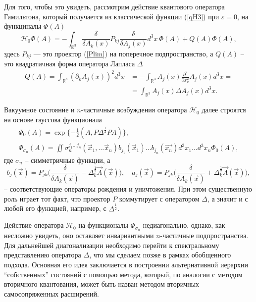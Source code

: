 \documentclass[12pt]{article}
\newcommand{\pl}{\partial}
\newcommand{\HH}{\mathscr{H}}
\newcommand{\RR}{\mathbb{R}}
\newcommand{\ve}{\varepsilon}
\begin{document}
    Для того, чтобы это увидеть, рассмотрим действие квантового оператора
    Гамильтона, который получается из классической функции
(\ref{qH3})
    при
$ \ve = 0 $,
    на функциналы
$ \Phi(A) $
\begin{equation}
\label{qH0}
    \HH_{0}\Phi(A) = - \int_{\RR^{3}} \frac{\delta}{\delta A_{k}(x)}
	P_{kj} \frac{\delta}{\delta A_{j}(x)} d^{3}x \,\Phi(A)
	+ Q(A) \Phi(A) ,
\end{equation}
    здесь
$ P_{kj} $ ---
    это проектор
(\ref{Plim}) на поперечное подпространство, а
$ Q(A) $ -- это квадратичная форма оператора Лапласа
$ \Delta $
\begin{align}
\nonumber
    Q(A) = \int_{\RR^{3}} (\pl_{k}A_{j}(x))^{2} d^{3}x
	&= - \int_{\RR^{3}} A_{j}(x) \frac{\pl^{2}}{\pl x_{k}^{2}} A_{j}(x)
	    d^{3} x =\\
\label{QA}
	&= \int_{\RR^{3}} A_{j}(x) \Delta A_{j}(x) d^{3}x .
\end{align}

    Вакуумное состояние и
$ n $-частичные возбуждения оператора
$ \HH_{0} $
    далее строятся на основе гауссова функционала
\begin{gather}
\label{Phi0}
    \Phi_{0}(A) = \exp\{-\frac{1}{2}(A,P\Delta^{\frac{1}{2}}PA)\} ,\\
\label{Phin}
    \Phi_{\sigma_{n}}(A) = \iint
    \sigma_{n}^{j_{1}\ldots j_{n}} (\vec{x}_{1},\ldots \vec{x}_{n})
	b_{j_{1}}(\vec{x}_{1}) \ldots b_{j_{n}}(\vec{x_{n}})
    d^{3}x_{1} \ldots d^{3}x_{n} \Phi_{0}(A) ,
\end{gather}
    где
$ \sigma_{n} $ -- симметричные функции, а
\begin{equation*}
    b_{j}(\vec{x}) = P_{jk}\bigl(\frac{\delta}{\delta A_{k}(\vec{x})}
	- \Delta^{\frac{1}{2}}_{k}\vec{A}(\vec{x})\bigr) ,\quad
    a_{j}(\vec{x}) = P_{jk}\bigl(\frac{\delta}{\delta A_{k}(\vec{x})}
	+ \Delta^{\frac{1}{2}}_{k}\vec{A}(\vec{x})\bigr) ,
\end{equation*}
    -- соответствующие операторы рождения и уничтожения.
    При этом существенную роль играет тот факт, что проектор
$ P $
    коммутирует с оператором
$ \Delta $,
    а значит и с любой его функцией, например, с 
$ \Delta^{\frac{1}{2}} $.

    Действие оператора
$ \HH_{0} $
    на функционалы
$ \Phi_{\sigma_{n}} $
    недиагонально, однако, как несложно увидеть, оно оставляет инвариантными
$ n $-частичные подпространства.
    Для дальнейшей диагонализации необходимо перейти к спектральному
    представлению оператора
$ \Delta $,
    что мы сделаем позже в рамках обобщенного подхода.
    Основная его идея заключается в построении альтернативной
    иерархии ``собственных'' состояний с помощью метода, который, по аналогии
    с методом вторичного квантования, может быть назван методом вторичных
    самосопряженных расширений.
\end{document}

